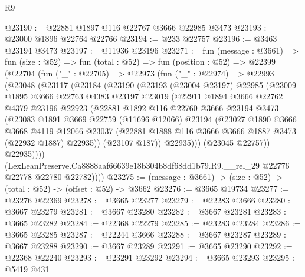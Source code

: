 \begin{lexlean}{R9}
\begin{coremodule}
@23190 := @22881 @1897 @116 @22767 @3666 @22985 @3473
@23193 := @23000 @1896 @22764 @22766
@23194 := @233 @22757
@23196 := @3463 @23194 @3473
@23197 := @11936 @23196
@23271 := fun (message : @3661) =>
  fun (size : @52) =>
  fun (total : @52) =>
  fun (position : @52) =>
  @22399
    (@22704
      (fun ("_" : @22705) =>
      @22973
        (fun ("_" : @22974) =>
        @22993
          (@23048
            (@23117
              (@23184
                (@23190
                  (@23193
                    (@23004 @23197)
                    @22985
                    (@23009
                      @1895
                      @3666
                      @22763
                      @4383
                      @23197
                      @23019
                      (@22911
                        @1894
                        @3666
                        @22762
                        @4379
                        @23196
                        @22923
                        (@22881
                          @1892
                          @116
                          @22760
                          @3666
                          @23194
                          @3473
                          (@23083
                            @1891
                            @3669
                            @22759
                            (@11696 @12066)
                            @23194
                            (@23027
                              @1890
                              @3666
                              @3668
                              @4119
                              @12066
                              @23037
                              (@22881 @1888 @116 @3666 @3666 @1887 @3473 (@22932 @1887) @22935))
                            (@23107 @187))
                          @22935)))
                    (@23045 @22757))
                  @22935))))
          (LexLeanPreserve.Ca8888aaf66639e18b304b8df68dd1b79.R9.__rel_29
            @22776
            @22778
            @22780
            @22782))))
@23275 := (message : @3661) -> (size : @52) -> (total : @52) -> (offset : @52) -> @3662
@23276 := @3665 @19734
@23277 := @23276 @22369
@23278 := @3665 @23277
@23279 := @22283 @3666
@23280 := @3667 @23279
@23281 := @3667 @23280
@23282 := @3667 @23281
@23283 := @3665 @23282
@23284 := @22368 @22279
@23285 := @23283 @23284
@23286 := @3665 @23285
@23287 := @22244 @3666
@23288 := @3667 @23287
@23289 := @3667 @23288
@23290 := @3667 @23289
@23291 := @3665 @23290
@23292 := @22368 @22240
@23293 := @23291 @23292
@23294 := @3665 @23293
@23295 := @5419 @431

\end{coremodule}
\end{lexlean}
